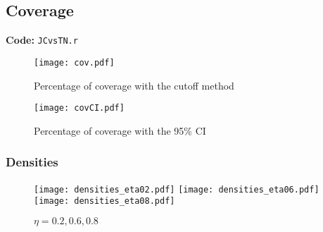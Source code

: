 \documentclass[12pt,letterpaper]{article}
\begin{document}
\pagebreak

\subsection{Coverage}

\textbf{Code:} \texttt{JCvsTN.r}

\begin{figure}[ht]
\centering
\texttt{[image: cov.pdf]}
\caption{Percentage of coverage with the cutoff method}
\end{figure}

\begin{figure}[ht]
\centering
\texttt{[image: covCI.pdf]}
\caption{Percentage of coverage with the 95\% CI}
\end{figure}

\pagebreak

\subsubsection{Densities}

\begin{figure}[ht]
\centering
\texttt{[image: densities\_eta02.pdf]}
\texttt{[image: densities\_eta06.pdf]}
\texttt{[image: densities\_eta08.pdf]}
\caption{$\eta=0.2,0.6,0.8$}
\end{figure}
\end{document}
